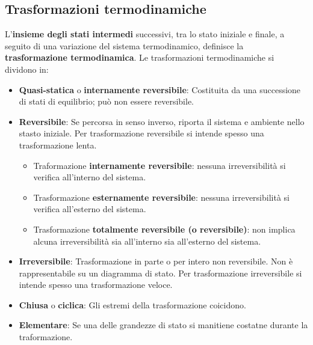 \subsection{Trasformazioni termodinamiche}
L’\textbf{insieme degli stati intermedi} successivi, tra lo stato iniziale e finale, a seguito di una variazione del sistema termodinamico, definisce la \textbf{trasformazione termodinamica}.\newline
\newline
Le trasformazioni termodinamiche si dividono in:
\begin{itemize}
    \item \textbf{Quasi-statica} o \textbf{internamente reversibile}: Costituita da una successione di stati di equilibrio; può non essere reversibile. 
    \item \textbf{Reversibile}: Se percorsa in senso inverso, riporta il sistema e ambiente nello stasto iniziale. Per trasformazione reversibile si intende spesso una trasformazione lenta.
    \begin{itemize}
        \item Traformazione \textbf{internamente reversibile}: nessuna irreversibilità si verifica all'interno del sistema.
        \item Trasformazione \textbf{esternamente reversibile}: nessuna irreversibilità si verifica all'esterno del sistema.
        \item Trasformazione \textbf{totalmente reversibile (o reversibile)}: non implica alcuna irreversibilità sia all'interno sia all'esterno del sistema.
    \end{itemize}
    \item \textbf{Irreversibile}: Trasformazione in parte o per intero non reversibile. Non è rappresentabile su un diagramma di stato. Per trasformazione irreversibile si intende spesso una trasformazione veloce.
    \item \textbf{Chiusa} o \textbf{ciclica}: Gli estremi della trasformazione coicidono.
    \item \textbf{Elementare}: Se una delle grandezze di stato si manitiene costatne durante la traformazione.
\end{itemize}
